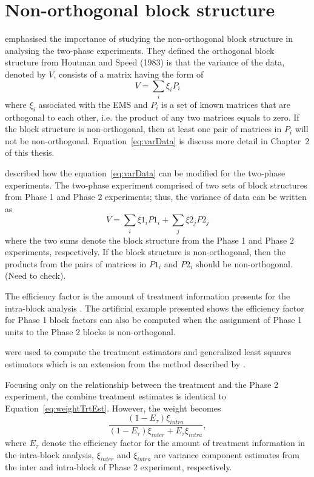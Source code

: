 \documentclass[11pt,a4paper]{article}
\begin{document}
\section{Non-orthogonal block structure}
\cite{Wood1988} emphasised the importance of studying the non-orthogonal block structure in analysing the two-phase experiments. They defined the orthogonal block structure from Houtman and Speed (1983) is that the variance of the data, denoted by $V$, consists of a matrix having the form of 
\begin{equation} \label{eq:varData}
V = \sum_{i} \xi_i P_i
\end{equation}
where  $\xi_i$ associated with the EMS and $P_i$ is a set of known matrices that are orthogonal to each other, i.e. the product of any two matrices equals to zero. If the block structure is non-orthogonal, then at least one pair of matrices in $P_i$ will not be non-orthogonal. Equation~\ref{eq:varData} is discuss more detail in Chapter~2 of this thesis. 

\cite{Wood1988} described how the equation~\ref{eq:varData} can be modified for the two-phase experiments. The two-phase experiment comprised of two sets of block structures from Phase 1 and Phase 2 experiments; thus, the variance of data can be written as 
\begin{equation}
V = \sum_{i} \xi1_i P1_i + \sum_{j} \xi2_j P2_j
\end{equation}
where the two sums denote the block structure from the Phase 1 and Phase 2 experiments, respectively. If the block structure is non-orthogonal, then the products from the pairs of matrices in  $P1_i$ and $P2_i$ should be non-orthogonal. (Need to check). 

The efficiency factor is the amount of treatment information presents for the intra-block analysis \citep{Yates1936}. The artificial example presented shows the efficiency factor for Phase 1 block factors can also be computed when the assignment of Phase 1 units to the Phase 2 blocks is non-orthogonal. 

 were used to compute the treatment estimators and generalized least squares estimators which is an extension from the method described by \cite{Curnow1959}. 

Focusing only on the relationship between the treatment and the Phase 2 experiment, the combine treatment estimates is identical to Equation~\ref{eq:weightTrtEst}. However, the weight becomes
\begin{equation} \label{eq:weightWood}
\frac{(1 - E_\tau)\xi_{intra}}{(1 - E_\tau)\xi_{inter} + E_\tau \xi_{intra}},
\end{equation}
where $E_\tau$ denote the efficiency factor for the amount of treatment information in the intra-block analysis, $\xi_{inter}$ and $\xi_{intra}$ are variance component estimates from the inter and intra-block of Phase 2 experiment, respectively. 
\end{document}
